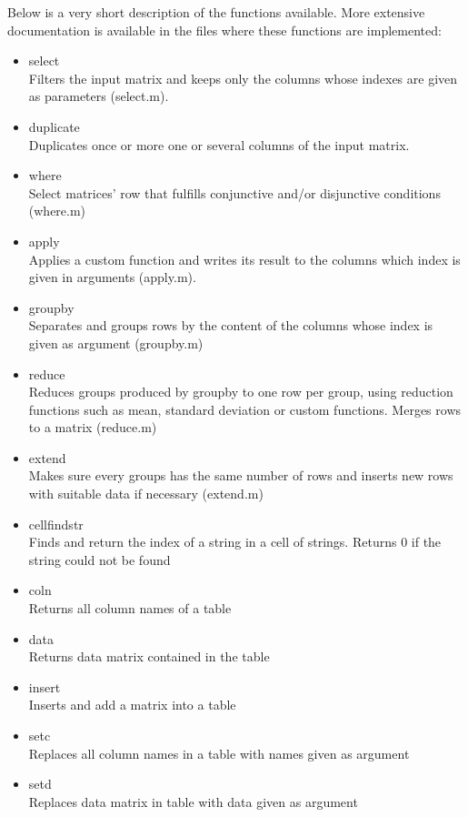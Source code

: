 Below is a very short description of the functions available. More extensive documentation is available in the files where these functions are implemented:
\begin{itemize}
\item select\\
Filters the input matrix and keeps only the columns whose indexes are given as parameters (select.m).
\item duplicate\\ 
Duplicates once or more one or several columns of the input matrix.
\item where\\
Select matrices' row that fulfills conjunctive and/or disjunctive conditions (where.m)
\item apply\\
Applies a custom function and writes its result to the columns which index is given in arguments (apply.m).
\item groupby\\
Separates and groups rows by the content of the columns whose index is given as argument (groupby.m)
\item reduce\\
Reduces groups produced by groupby to one row per group, using reduction functions such as mean, standard deviation or custom functions. Merges rows to a matrix (reduce.m)
\item extend\\
Makes sure every groups has the same number of rows and inserts new rows with suitable data if necessary (extend.m)
\item cellfindstr\\
Finds and return the index of a string in a cell of strings. Returns 0 if the string could not be found
\item coln\\
Returns all column names of a table
\item data\\
Returns data matrix contained in the table
\item insert\\
Inserts and add a matrix into a table
\item setc\\
Replaces all column names in a table with names given as argument
\item setd\\
Replaces data matrix in table with data given as argument
\end{itemize}


